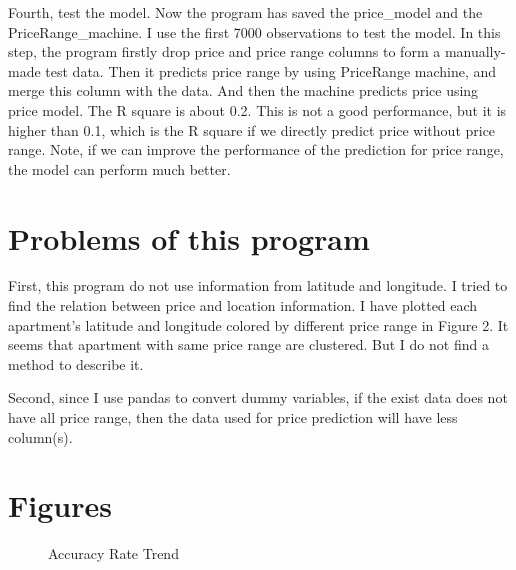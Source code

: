\documentclass[12pt]{article}
\begin{document}
Fourth, test the model. Now the program has saved the price\_model and the
PriceRange\_machine. I use the first 7000 observations to test the model.
In this step, the program firstly drop price and price range columns to form
a manually-made test data. Then it predicts price range by using PriceRange
machine, and merge this column with the data. And then the machine predicts price
using price model. The R square is about 0.2. This is not a good performance, but
it is higher than 0.1, which is the R square if we directly predict price without
price range. Note, if we can improve the performance of the prediction for
price range, the model can perform much better. 




\section{Problems of this program}

First, this program do not use information from latitude and longitude. I tried
to find the relation between price and location information. I have plotted each
apartment's latitude and longitude colored by different price range in 
Figure 2. It seems that apartment with same price range are clustered. But 
I do not find a method to describe it. 

Second, since I use pandas to convert dummy variables, if the exist data
does not have all price range, then the data used for price prediction will
have less column(s).




\newpage
\section{Figures}



\begin{figure}[H]
 \caption{Accuracy Rate Trend}
\end{figure}
\end{document}
